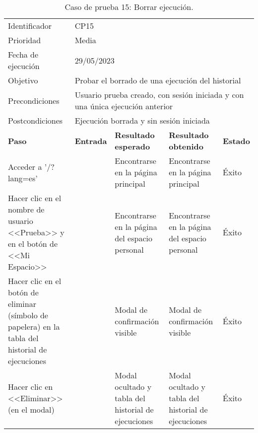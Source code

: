 \begin{table}[H]
\begin{tabular}{p{}p{}p{}p{}p{}}
\rowcolor{gray!25}
Identificador   & \multicolumn{4}{l}{CP15}                                                   \\
Prioridad   & \multicolumn{4}{l}{Media}                                                    \\
\rowcolor{gray!25}
Fecha de ejecución   & \multicolumn{4}{l}{29/05/2023}                                                    \\
Objetivo        & \multicolumn{4}{p{0.84\textwidth}}{Probar el borrado de una ejecución del historial}                                                     \\
\rowcolor{gray!25}
Precondiciones  & \multicolumn{4}{p{0.84\textwidth}}{Usuario prueba creado, con sesión iniciada y con una única ejecución anterior}                                                     \\
Postcondiciones & \multicolumn{4}{l}{Ejecución borrada y sin sesión iniciada}                                                     \\ \hline
\rowcolor{gray!25}
\textbf{Paso}   & \textbf{Entrada} & \textbf{Resultado esperado} & \textbf{Resultado obtenido} & \textbf{Estado} \\ \hline
Acceder a '/?lang=es'                                 &                        & Encontrarse en la página principal                                   & Encontrarse en la página principal                           & Éxito  \\ \hline
Hacer clic en el nombre de usuario <<Prueba>> y en el botón de <<Mi Espacio>>  &     & Encontrarse en la página del espacio personal                  & Encontrarse en la página del espacio personal                       & Éxito  \\ \hline 
Hacer clic en el botón de eliminar (símbolo de papelera) en la tabla del historial de ejecuciones &                     & Modal de confirmación visible                                     & Modal de confirmación visible                     & Éxito                            \\ \hline
Hacer clic en <<Eliminar>> (en el modal)              &                        & Modal ocultado y tabla del historial de ejecuciones                    & Modal ocultado y tabla del historial de ejecuciones            & Éxito                            \\ \hline
\end{tabular}
\caption{Caso de prueba 15: Borrar ejecución.}
\end{table}

